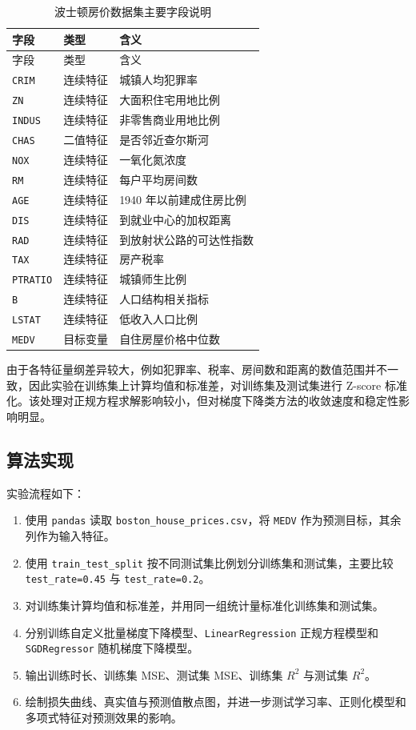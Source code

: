 \documentclass[UTF8,a4paper,12pt]{ctexart}
\begin{document}
\begin{longtable}{lll}
\caption{波士顿房价数据集主要字段说明}\label{tab:features}\\
\toprule
字段 & 类型 & 含义\\
\midrule
\endfirsthead
\toprule
字段 & 类型 & 含义\\
\midrule
\endhead
\texttt{CRIM} & 连续特征 & 城镇人均犯罪率\\
\texttt{ZN} & 连续特征 & 大面积住宅用地比例\\
\texttt{INDUS} & 连续特征 & 非零售商业用地比例\\
\texttt{CHAS} & 二值特征 & 是否邻近查尔斯河\\
\texttt{NOX} & 连续特征 & 一氧化氮浓度\\
\texttt{RM} & 连续特征 & 每户平均房间数\\
\texttt{AGE} & 连续特征 & 1940 年以前建成住房比例\\
\texttt{DIS} & 连续特征 & 到就业中心的加权距离\\
\texttt{RAD} & 连续特征 & 到放射状公路的可达性指数\\
\texttt{TAX} & 连续特征 & 房产税率\\
\texttt{PTRATIO} & 连续特征 & 城镇师生比例\\
\texttt{B} & 连续特征 & 人口结构相关指标\\
\texttt{LSTAT} & 连续特征 & 低收入人口比例\\
\texttt{MEDV} & 目标变量 & 自住房屋价格中位数\\
\bottomrule
\end{longtable}

由于各特征量纲差异较大，例如犯罪率、税率、房间数和距离的数值范围并不一致，因此实验在训练集上计算均值和标准差，对训练集及测试集进行 Z-score 标准化。该处理对正规方程求解影响较小，但对梯度下降类方法的收敛速度和稳定性影响明显。

\subsection{算法实现}

实验流程如下：
\begin{enumerate}
    \item 使用 \texttt{pandas} 读取 \texttt{boston\_house\_prices.csv}，将 \texttt{MEDV} 作为预测目标，其余列作为输入特征。
    \item 使用 \texttt{train\_test\_split} 按不同测试集比例划分训练集和测试集，主要比较 \texttt{test\_rate=0.45} 与 \texttt{test\_rate=0.2}。
    \item 对训练集计算均值和标准差，并用同一组统计量标准化训练集和测试集。
    \item 分别训练自定义批量梯度下降模型、\texttt{LinearRegression} 正规方程模型和 \texttt{SGDRegressor} 随机梯度下降模型。
    \item 输出训练时长、训练集 MSE、测试集 MSE、训练集 $R^2$ 与测试集 $R^2$。
    \item 绘制损失曲线、真实值与预测值散点图，并进一步测试学习率、正则化模型和多项式特征对预测效果的影响。
\end{enumerate}
\end{document}
